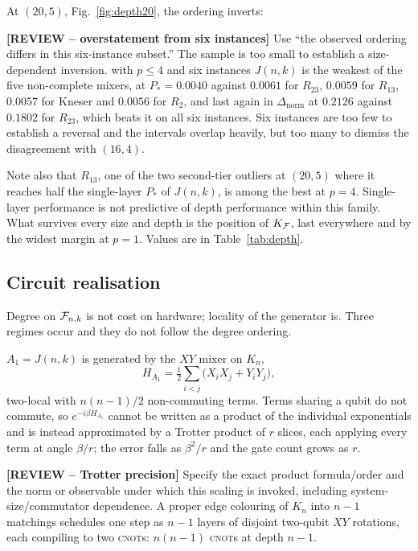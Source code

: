 At $(20,5)$, Fig.~\ref{fig:depth20}, the ordering inverts:

{\color{red}\textbf{[REVIEW -- overstatement from six instances]} Use ``the observed ordering differs in this six-instance subset.'' The sample is too small to establish a size-dependent inversion.} with $p\le4$
and six instances $J(n,k)$ is the weakest of the five non-complete
mixers, at $P_*=0.0040$ against $0.0061$ for $R_{23}$, $0.0059$ for
$R_{13}$, $0.0057$ for Kneser and $0.0056$ for $R_2$, and last again in
$\Delta_{\mathrm{norm}}$ at $0.2126$ against $0.1802$ for $R_{23}$, which
beats it on all six instances. Six instances are too few to establish a
reversal and the intervals overlap heavily, but too many to dismiss the
disagreement with $(16,4)$.

Note also that $R_{13}$, one of the two second-tier outliers at $(20,5)$
where it reaches half the single-layer $P_*$ of $J(n,k)$, is among the
best at $p=4$. Single-layer performance is not predictive of depth
performance within this family. What survives every size and depth is
the position of $K_{\mathcal{F}}$, last everywhere and by the widest margin at
$p=1$. Values are in Table~\ref{tab:depth}.

\subsection{\label{sec:circuits}Circuit realisation}
Degree on $\mathcal{F}_{n,k}$ is not cost on hardware; locality of the generator
is. Three regimes occur and they do not follow the degree ordering.

$A_1=J(n,k)$ is generated by the $XY$ mixer on $K_n$,
\begin{equation}
    H_{A_1}=\tfrac12\sum_{i<j}\bigl(X_iX_j+Y_iY_j\bigr),
    \label{eq:xy-mixer}
\end{equation}
two-local with $n(n-1)/2$ non-commuting terms. Terms sharing a qubit do not commute, so
$e^{-i\beta H_{A_1}}$ cannot be written as a product of the individual
exponentials and is instead approximated by a Trotter product of $r$
slices, each applying every term at angle $\beta/r$; the error falls as
$\beta^{2}/r$ and the gate count grows as $r$.

{\color{red}\textbf{[REVIEW -- Trotter precision]} Specify the exact product formula/order and the norm or observable under which this scaling is invoked, including system-size/commutator dependence.} A
proper edge colouring of $K_n$ into $n-1$ matchings schedules one step as
$n-1$ layers of disjoint two-qubit $XY$ rotations, each compiling to two
\textsc{cnot}s: $n(n-1)$ \textsc{cnot}s at depth $n-1$.

